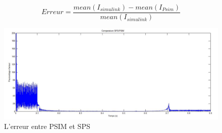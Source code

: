 \documentclass[11pt,letterpaper,final]{report}
\begin{document}
\begin{equation}
Erreur = \frac{mean(I_{simulink})-mean(I_{Psim})}{mean(I_{simulink})}
\label{eq2}
\end{equation}


\begin{figure}[ht]
\centering
\includegraphics[scale=0.5]{comp_PSIM_SPS.jpg}
\caption{L'erreur entre PSIM et SPS}
\label{comp_PSIM_SPS}
\end{figure}
\end{document}

